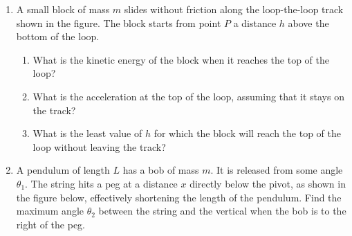 \documentclass{../../../oss-classkick}
\begin{document}
\begin{enumerate}[leftmargin=15pt]
\item A small block of mass $m$ slides without friction along the loop-the-loop
  track shown in the figure. The block starts from point $P$ a distance $h$
  above the bottom of the loop.
  \begin{center}
  \end{center}
  \begin{enumerate}[nosep]
  \item What is the kinetic energy of the block when it reaches the top of
    the loop?
  \item What is the acceleration at the top of the loop, assuming that it
    stays on the track?
  \item What is the least value of $h$ for which the block will reach the top
    of the loop without leaving the track?
  \end{enumerate}
  \newpage

\item A pendulum of length $L$ has a bob of mass $m$. It is released from some
  angle $\theta_1$. The string hits a peg at a distance $x$ directly below the
  pivot, as shown in the figure below, effectively shortening the length of the
  pendulum. Find the maximum angle $\theta_2$ between the string and the
  vertical when the bob is to the right of the peg.
  \begin{center}
  \end{center}
  \vspace{\stretch1}
  \newpage
  

\end{enumerate}
\end{document}
